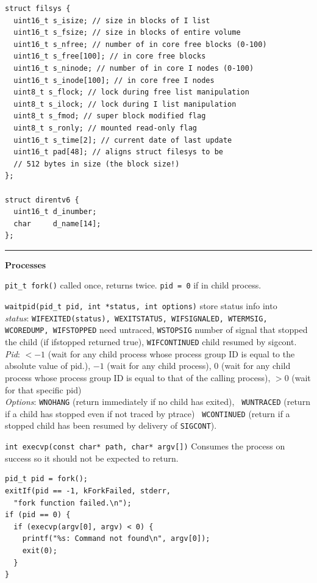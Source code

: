 \documentclass{article}
\begin{document}
\begin{multicols}{2}
\begin{verbatim}
struct filsys {
  uint16_t s_isize; // size in blocks of I list
  uint16_t s_fsize; // size in blocks of entire volume
  uint16_t s_nfree; // number of in core free blocks (0-100)
  uint16_t s_free[100]; // in core free blocks
  uint16_t s_ninode; // number of in core I nodes (0-100)
  uint16_t s_inode[100]; // in core free I nodes
  uint8_t s_flock; // lock during free list manipulation
  uint8_t s_ilock; // lock during I list manipulation
  uint8_t s_fmod; // super block modified flag
  uint8_t s_ronly; // mounted read-only flag
  uint16_t s_time[2]; // current date of last update
  uint16_t pad[48]; // aligns struct filesys to be
  // 512 bytes in size (the block size!)
};

struct direntv6 {
  uint16_t d_inumber;
  char     d_name[14];
};
  \end{verbatim}

  \noindent\rule{4cm}{0.4pt}

  {\bf Processes}

  {\tt pit\_t fork()} called once, returns twice. {\tt pid = 0} if in child
  process.

  {\tt waitpid(pid\_t pid, int *status, int options)} store status info into\\
  {\it status}: {\tt WIFEXITED(status), WEXITSTATUS, WIFSIGNALED, WTERMSIG,
  WCOREDUMP, WIFSTOPPED} need untraced, {\tt WSTOPSIG} number of signal that
  stopped the child (if ifstopped returned true), {\tt WIFCONTINUED} child
  resumed by
  sigcont.\\
  {\it Pid}: $<-1$ (wait for any child process whose process group ID is equal to the
  absolute value of pid.), $-1$ (wait for any child process), $0$ (wait for any
  child process whose process group ID is equal to that of the calling process),
  $>0$ (wait for that specific pid)\\
  {\it Options}: {\tt WNOHANG} (return immediately if no child has exited), {\tt
  WUNTRACED} (return if a child has stopped even if not traced by ptrace) {\tt
  WCONTINUED} (return if a stopped child has been resumed by delivery of
  \texttt{SIGCONT}).

  {\tt int execvp(const char* path, char* argv[])} Consumes the process on
  success so it should not be expected to return.
\begin{verbatim}
pid_t pid = fork();
exitIf(pid == -1, kForkFailed, stderr,
  "fork function failed.\n");
if (pid == 0) {
  if (execvp(argv[0], argv) < 0) {
    printf("%s: Command not found\n", argv[0]);
    exit(0);
  }
}\end{verbatim}


\end{multicols}
\end{document}
